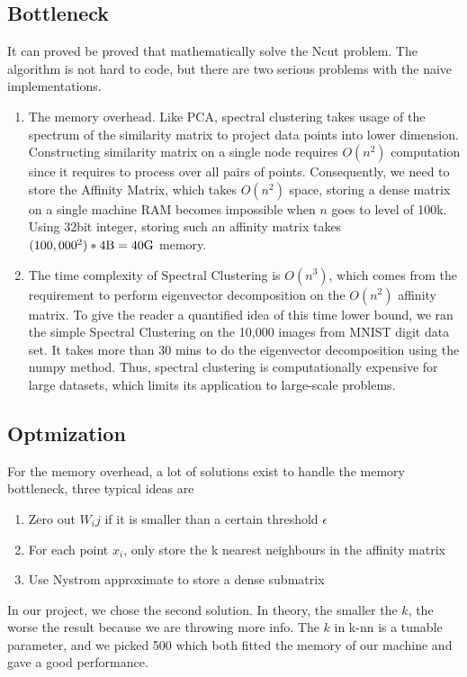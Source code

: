 \documentclass{acm_proc_article-sp}
\begin{document}
\subsection{Bottleneck}
It can proved be proved that mathematically solve the Ncut problem. The algorithm is not hard to code, but there are two serious problems with the naive implementations.
\begin{enumerate}
\item{The memory overhead. Like PCA, spectral clustering takes usage of the spectrum of the similarity matrix to project data points into lower dimension. Constructing similarity matrix on a single node requires $O(n^2)$ computation since it requires to process over all pairs of points. Consequently, we need to store the Affinity Matrix, which takes $O(n^2)$ space, storing a dense matrix on a single machine RAM becomes impossible when $n$ goes to level of 100k. Using 32bit integer, storing such an affinity matrix takes $(100,000^2) * 4 \textnormal{B} = 40 \textnormal{G}$ memory.
}
\item{The time complexity of Spectral Clustering is $O(n^3)$, which comes from the requirement to perform eigenvector decomposition on the $O(n^2)$ affinity matrix. To give the reader a quantified idea of this time lower bound, we ran the simple Spectral Clustering on the 10,000 images from MNIST digit data set. It takes more than 30 mins to do the eigenvector decomposition using the numpy method. Thus, spectral clustering is computationally expensive for large datasets, which limits its application to large-scale problems.}
\end{enumerate}

\subsection{Optmization}
For the memory overhead, a lot of solutions exist to handle the memory bottleneck, three typical ideas are
\begin{enumerate}
\item{Zero out $W_ij$ if it is smaller than a certain threshold $\epsilon$}
\item{For each point $x_i$, only store the k nearest neighbours in the affinity matrix}
\item{Use Nystrom approximate to store a dense submatrix}
\end{enumerate}
In our project, we chose the second solution. In theory, the smaller the $k$, the worse the result because we are throwing more info.  The $k$ in k-nn is a tunable parameter, and we picked 500 which both fitted the memory of our machine and gave a good performance. 
\end{document}
